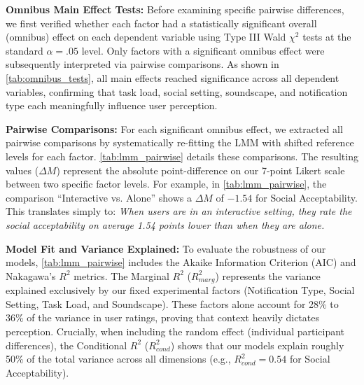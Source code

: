 \textbf{Omnibus Main Effect Tests:} Before examining specific pairwise differences, we first verified whether each factor had a statistically significant overall (omnibus) effect on each dependent variable using Type III Wald $\chi^2$ tests at the standard $\alpha = .05$ level. Only factors with a significant omnibus effect were subsequently interpreted via pairwise comparisons. As shown in \autoref{tab:omnibus_tests}, all main effects reached significance across all dependent variables, confirming that task load, social setting, soundscape, and notification type each meaningfully influence user perception.

\textbf{Pairwise Comparisons:} For each significant omnibus effect, we extracted all pairwise comparisons by systematically re-fitting the LMM with shifted reference levels for each factor. \autoref{tab:lmm_pairwise} details these comparisons. The resulting values ($\Delta M$) represent the absolute point-difference on our 7-point Likert scale between two specific factor levels. 
For example, in \autoref{tab:lmm_pairwise}, the comparison ``Interactive vs. Alone'' shows a $\Delta M$ of $-1.54$ for Social Acceptability. This translates simply to: \textit{When users are in an interactive setting, they rate the social acceptability on average 1.54 points lower than when they are alone.}

\textbf{Model Fit and Variance Explained:} To evaluate the robustness of our models, \autoref{tab:lmm_pairwise} includes the Akaike Information Criterion (AIC) and Nakagawa's $R^2$ metrics. The Marginal $R^2$ ($R^2_{marg}$) represents the variance explained exclusively by our fixed experimental factors (Notification Type, Social Setting, Task Load, and Soundscape). These factors alone account for 28\% to 36\% of the variance in user ratings, proving that context heavily dictates perception. Crucially, when including the random effect (individual participant differences), the Conditional $R^2$ ($R^2_{cond}$) shows that our models explain roughly 50\% of the total variance across all dimensions (e.g., $R^2_{cond} = 0.54$ for Social Acceptability).


